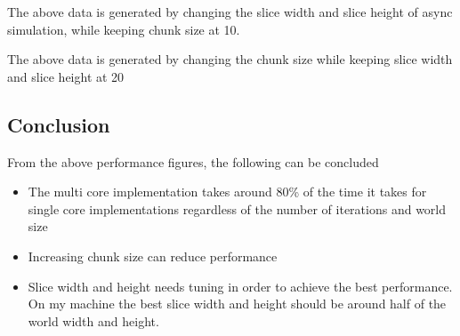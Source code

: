 \documentclass{article}
\begin{document}
      \begin{figure}[H]
        \centering
      \end{figure}

      The above data is generated by changing the slice width and slice
      height of async simulation, while keeping chunk size at 10.

      \begin{figure}[H]
        \centering
      \end{figure}

      The above data is generated by changing the chunk size while
      keeping slice width and slice height at 20

    \subsection{Conclusion}

      From the above performance figures, the following can be concluded

      \begin{itemize}
        \item The multi core implementation takes around 80\% of the time
        it takes for single core implementations regardless of the number
        of iterations and world size
        \item Increasing chunk size can reduce performance
        \item Slice width and height needs tuning in order to achieve the
        best performance. On my machine the best slice width and height
        should be around half of the world width and height.
      \end{itemize}
\end{document}
